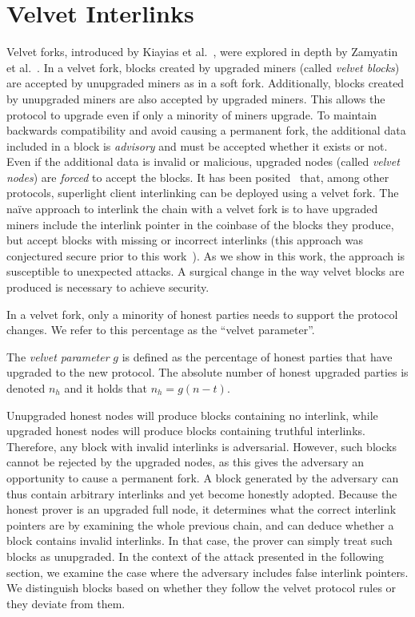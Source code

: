 \section{Velvet Interlinks}\label{sec:velvet}
Velvet forks, introduced by Kiayias et al.~\cite{nipopows},
were explored in depth by Zamyatin et al.~\cite{velvet}. In a
velvet fork, blocks created by upgraded miners (called \emph{velvet blocks}) are
accepted by unupgraded miners as in a soft fork. Additionally, blocks created by
unupgraded miners are also accepted by upgraded miners. This allows the protocol
to upgrade even if only a minority of miners upgrade. To maintain
backwards compatibility and avoid causing a permanent fork, the additional data included
in a block is \emph{advisory} and must be accepted whether it exists or not.
Even if the additional data is invalid or malicious, upgraded nodes
(called \emph{velvet nodes}) are \emph{forced} to accept the blocks.
It has been posited~\cite{nipopows,flyclient} that,
among other protocols, superlight client interlinking
can be deployed using a velvet fork.
The
na\"ive approach to interlink the chain with a velvet fork is to have
upgraded miners include the interlink pointer in the coinbase of the blocks they produce, but
accept blocks with missing or incorrect interlinks
(this approach was conjectured secure prior to this work~\cite{nipopows,flyclient}).
As we show in this work, the approach is susceptible to unexpected attacks. A
surgical change in the way velvet blocks are produced is necessary to achieve
security.

In a velvet fork, only a minority of honest parties needs to support the protocol
changes. We refer to this percentage as the ``velvet parameter''.

\begin{definition}
	The \emph{velvet parameter} $g$ is defined as the percentage of honest parties
	that have upgraded to the new protocol. The absolute number of honest upgraded
	parties is denoted $n_h$ and it holds that
	$n_h = g (n - t)$.
	\label{defn:velvet_honest_majority}
\end{definition}

Unupgraded honest nodes will produce blocks
containing no interlink, while upgraded honest nodes will produce blocks
containing truthful interlinks. Therefore, any block with invalid interlinks is
adversarial. However, such blocks cannot be rejected by the
upgraded nodes, as this gives the adversary an opportunity to cause a permanent
fork. A block generated by the adversary can thus contain arbitrary interlinks
and yet become honestly adopted. Because the honest prover is an
upgraded full node, it determines what the correct interlink pointers are by
examining the whole previous chain, and can deduce whether a block contains
invalid interlinks. In that case, the prover can simply treat such blocks as
unupgraded. In the context of the attack presented in the following
section, we examine the case where the adversary includes false interlink
pointers. We distinguish blocks based on whether they follow the velvet protocol
rules or they deviate from them.

